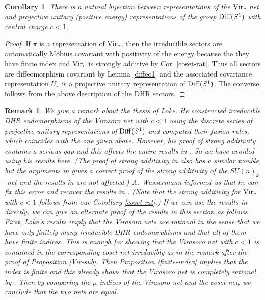 \documentclass[12pt]{article}
\def\Diff{{\rm Diff}}
\def\Vir{{\rm Vir}}
\newtheorem{corollary}[theorem]{Corollary}
\newtheorem{remark}[theorem]{Remark}
\begin{document}
\begin{corollary}
\label{net-diff}
There is a natural bijection between 
representations of the $\Vir_c$ 
net and projective unitary (positive energy) representations of the group 
$\Diff(S^1)$ with central charge $c<1$.
\end{corollary}

\begin{proof}
If $\pi$ is a representation of $\Vir_c$, then the irreducible sectors 
are automatically M\"{o}bius covariant with 
positivity of the energy \cite{GL1} 
because the they have finite index and $\Vir_c$ is strongly additive
by Cor. \ref{coset-rat}. Thus all sectors are diffeomorphism 
covariant by Lemma \ref{diffeo1} and the associated covariance 
representation $U_{\pi}$ is a projective unitary representation of $\Diff(S^1)$.
The converse follows from the above description of the DHR sectors.
\end{proof}

\begin{remark}\label{opr}{\rm
We give a remark about the thesis \cite{Lk}
of Loke.  He constructed irreducible DHR endomorphisms of the Virasoro
net with $c<1$ using the discrete series of projective unitary 
representations of 
$\Diff(S^1)$ and computed their fusion rules, which coincides with the one
given above.  However, his proof of strong additivity contains a serious
gap and this affects the entire results in \cite{Lk}.
So we have avoided using his results here. (The proof of strong additivity 
in \cite[Theorem E]{W} also has a similar trouble, but the arguments in
\cite{TL} gives a correct proof of the strong additivity of the
$SU(n)_k$-net and the results in \cite{W} are not affected.)
A. Wassermann informed us that he can fix this error and recover the
results in \cite{Lk}.  (Note that the strong additivity for $\Vir_c$ 
with $c<1$ follows from our Corollary \ref{coset-rat}.)
If we can use the results in \cite{Lk} directly,
we can give an alternate proof of the results in this section as
follows.  First, Loke's results imply that the Virasoro nets are
rational in the sense that we have only finitely many irreducible
DHR endomorphisms and that all of them have finite indices.  This is
enough for showing that the Virasoro net with $c<1$ is contained in the
corresponding coset net irreducibly as in the remark after the proof of
Proposition \ref{Vir-sub}.  Then Proposition \ref{finite-index} implies
that the index is finite and this already shows that the Virasoro net
is completely rational by \cite{L4}.  Then by comparing the $\mu$-indices
of the Virasoro net and the coset net, we conclude that
the two nets are equal.
}\end{remark}
\end{document}
